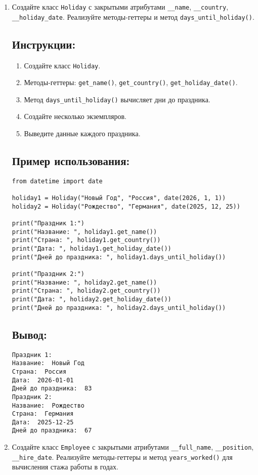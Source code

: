 \begin{enumerate}
\item
Создайте класс \texttt{Holiday} с закрытыми атрибутами \texttt{\_\_name}, \texttt{\_\_country}, \texttt{\_\_holiday\_date}. Реализуйте методы-геттеры и метод \texttt{days\_until\_holiday()}.

\subsection*{Инструкции:}
\begin{enumerate}
    \item Создайте класс \texttt{Holiday}.
    \item Методы-геттеры: \texttt{get\_name()}, \texttt{get\_country()}, \texttt{get\_holiday\_date()}.
    \item Метод \texttt{days\_until\_holiday()} вычисляет дни до праздника.
    \item Создайте несколько экземпляров.
    \item Выведите данные каждого праздника.
\end{enumerate}

\subsection*{Пример использования:}
\begin{lstlisting}[caption=Пример кода]
from datetime import date

holiday1 = Holiday("Новый Год", "Россия", date(2026, 1, 1))
holiday2 = Holiday("Рождество", "Германия", date(2025, 12, 25))

print("Праздник 1:")
print("Название: ", holiday1.get_name())
print("Страна: ", holiday1.get_country())
print("Дата: ", holiday1.get_holiday_date())
print("Дней до праздника: ", holiday1.days_until_holiday())

print("Праздник 2:")
print("Название: ", holiday2.get_name())
print("Страна: ", holiday2.get_country())
print("Дата: ", holiday2.get_holiday_date())
print("Дней до праздника: ", holiday2.days_until_holiday())
\end{lstlisting}

\subsection*{Вывод:}
\begin{lstlisting}[caption=Ожидаемый вывод]
Праздник 1:
Название:  Новый Год
Страна:  Россия
Дата:  2026-01-01
Дней до праздника:  83
Праздник 2:
Название:  Рождество
Страна:  Германия
Дата:  2025-12-25
Дней до праздника:  67
\end{lstlisting}
\item
Создайте класс \texttt{Employee} с закрытыми атрибутами \texttt{\_\_full\_name}, \texttt{\_\_position}, \texttt{\_\_hire\_date}. Реализуйте методы-геттеры и метод \texttt{years\_worked()} для вычисления стажа работы в годах.


\end{enumerate}
